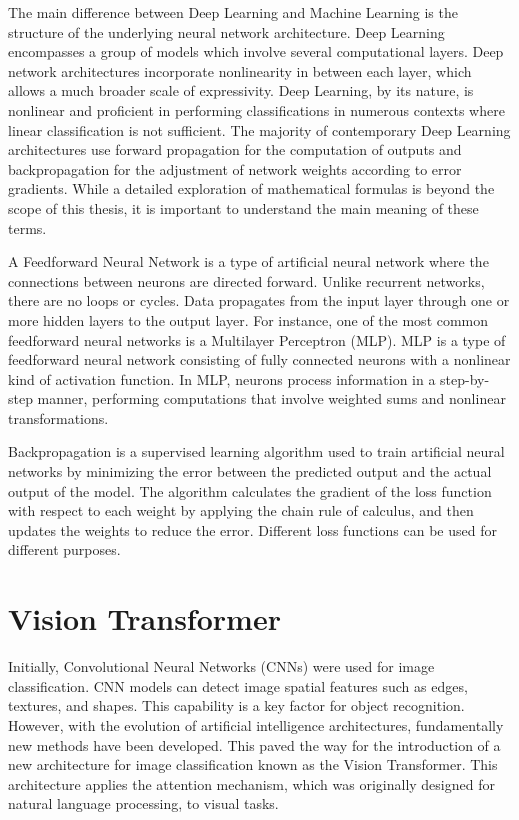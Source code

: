 The main difference between Deep Learning and Machine Learning is the structure of the underlying neural network architecture. Deep Learning encompasses a group of models which involve several computational layers. Deep network architectures incorporate nonlinearity in between each layer, which allows a much broader scale of expressivity. Deep Learning, by its nature, is nonlinear and proficient in performing classifications in numerous contexts where linear classification is not sufficient. The majority of contemporary Deep Learning architectures use forward propagation for the computation of outputs and backpropagation for the adjustment of network weights according to error gradients. While a detailed exploration of mathematical formulas is beyond the scope of this thesis, it is important to understand the main meaning of these terms.

A Feedforward Neural Network is a type of artificial neural network where the connections between neurons are directed forward. Unlike recurrent networks, there are no loops or cycles. Data propagates from the input layer through one or more hidden layers to the output layer. For instance, one of the most common feedforward neural networks is a Multilayer Perceptron (MLP). MLP is a type of feedforward neural network consisting of fully connected neurons with a nonlinear kind of activation function. In MLP, neurons process information in a step-by-step manner, performing computations that involve weighted sums and nonlinear transformations.

Backpropagation is a supervised learning algorithm used to train artificial neural networks by minimizing the error between the predicted output and the actual output of the model. The algorithm calculates the gradient of the loss function with respect to each weight by applying the chain rule of calculus, and then updates the weights to reduce the error. Different loss functions can be used for different purposes.

\section{Vision Transformer}

Initially, Convolutional Neural Networks (CNNs) were used for image classification. CNN models can detect image spatial features such as edges, textures, and shapes. This capability is a key factor for object recognition. However, with the evolution of artificial intelligence architectures, fundamentally new methods have been developed. This paved the way for the introduction of a new architecture for image classification known as the Vision Transformer. This architecture applies the attention mechanism, which was originally designed for natural language processing, to visual tasks.

